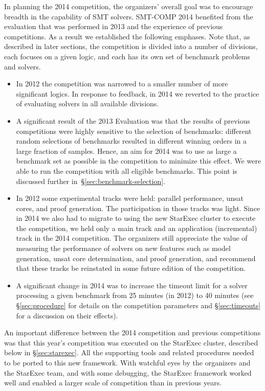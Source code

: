 \documentclass[twoside,11pt]{article}
\begin{document}
In planning the 2014 competition, the organizers' overall goal was to encourage breadth in the capability of SMT solvers.  SMT-COMP 2014 benefited from the evaluation that was performed in 2013 and the experience of previous competitions.  As a result we established the following emphases.  Note that, as described in later sections, the competition is divided into a number of divisions, each focuses on a given logic, and each has its own set of benchmark problems and solvers.
\begin{itemize}
\item In 2012 the competition was narrowed to a smaller number of more significant logics. In response to feedback, in 2014 we reverted to the practice of evaluating solvers in all available divisions.
\item A significant result of the 2013 Evaluation was that the results of previous competitions were highly sensitive to the selection of benchmarks: different random selections of benchmarks resulted in different winning orders in a large fraction of samples. Hence, an aim for 2014 was to use as large a benchmark set as possible in the competition to minimize this effect. We were able to run the competition with all eligible benchmarks. This point is discussed further in~\S\ref{sec:benchmark-selection}.
\item In 2012 some experimental tracks were held: parallel performance, unsat cores, and proof generation. The participation in those tracks was light. Since in 2014 we also had to migrate to using the new StarExec cluster to execute the competition, we held only a main track and an application (incremental) track in the 2014 competition. The organizers still appreciate the value of measuring the performance of solvers on new features such as model generation, unsat core determination, and proof generation, and recommend that these tracks be reinstated in some future edition of the competition.
\item A significant change in 2014 was to increase the timeout limit for a solver processing a given benchmark from 25 minutes (in 2012) to 40 minutes (see \S\ref{sec:procedure} for details on the competition parameters and \S\ref{sec:timeouts} for a discussion on their effects).




\end{itemize}

An important difference between the 2014 competition and previous competitions was that this year's competition was executed on the StarExec cluster, described below in \S\ref{sec:starexec}. All the supporting tools and related procedures needed to be ported to this new framework. With watchful eyes by the organizers and the StarExec team, and with some debugging, the StarExec framework worked well and enabled a larger scale of competition than in previous years.
\end{document}

